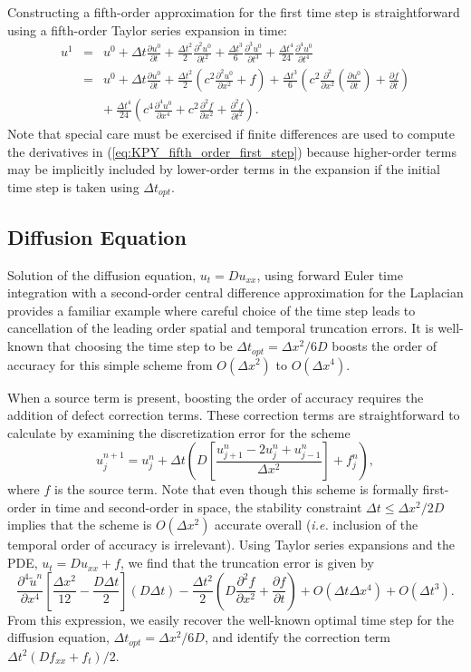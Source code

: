 \documentclass[fleqn,12pt,twoside]{article}
\newcommand{\beq}{\begin{equation}}
\newcommand{\eeq}{\end{equation}}
\newcommand{\bea}{\begin{eqnarray}}
\newcommand{\eea}{\end{eqnarray}}
\def\pt{\partial t}
\def\px{\partial x}
\def\tu{\tilde{u}}
\def\dt{\Delta t}
\def\dx{\Delta x}
\def\dto{\dt_{opt}}
\def\ie{\emph{i.e. }}
\begin{document}
Constructing a fifth-order approximation for the first time step is 
straightforward using a fifth-order Taylor series expansion in time:
\bea
  u^1 &=& u^0 + \dt \frac{\partial u^0}{\pt} 
              + \frac{\dt^2}{2} \frac{\partial^2 u^0}{\pt^2}
              + \frac{\dt^3}{6} \frac{\partial^3 u^0}{\pt^3} 
           + \frac{\dt^4}{24} \frac{\partial^4 u^0}{\pt^4}
  \nonumber \\
  &=& u^0 + \dt \frac{\partial u^0}{\pt} 
          + \frac{\dt^2}{2} \left(c^2 \frac{\partial^2 u^0}{\px^2} + f\right)
  + \frac{\dt^3}{6} \left(c^2 
    \frac{\partial^2}{\px^2} \left(\frac{\partial u^0}{\pt} \right) 
    + \frac{\partial f}{\pt}\right)
  \nonumber \\
  & & +\  \frac{\dt^4}{24} \left(c^4 \frac{\partial^4 u^0}{\px^4} 
  + c^2 \frac{\partial ^2 f}{\px^2} + \frac{\partial^2 f}{\pt^2} \right).
  \label{eq:KPY_fifth_order_first_step}
\eea
Note that special care must be exercised if finite differences are used to 
compute the derivatives in (\ref{eq:KPY_fifth_order_first_step}) because
higher-order terms may be implicitly included by lower-order terms in the 
expansion if the initial time step is taken using $\dto$.


\subsection{Diffusion Equation \label{sec:diffusion_eqn_1d}}
Solution of the diffusion equation, $u_t = D u_{xx}$, using forward Euler 
time integration with a second-order central difference approximation for 
the Laplacian provides a familiar example where careful choice of the time 
step leads to cancellation of the leading order spatial and temporal 
truncation errors.  It is well-known that choosing the time step to be 
$\dto = \dx^2/6D$ boosts the order of accuracy for this simple scheme 
from $O(\dx^2)$ to $O(\dx^4)$.

When a source term is present, boosting the order of accuracy requires
the addition of defect correction terms.  These correction terms are 
straightforward to calculate by examining the discretization error for the
scheme
\beq
  u^{n+1}_j = u^{n}_j 
  + \dt 
    \left( D \left[\frac{u^{n}_{j+1} -2 u^{n}_j + u^{n}_{j-1}}{\dx^2}\right] 
         + f^n_j \right),
  \label{eq:diffusion_eqn_1d_FD_scheme}
\eeq
where $f$ is the source term.  Note that even though this scheme is formally 
first-order in time and second-order in space, the stability constraint 
$\dt \le \dx^2/2D$ implies that the scheme is $O(\dx^2)$ accurate 
overall (\ie inclusion of the temporal order of accuracy is irrelevant).
Using Taylor series expansions and the PDE, $u_t = D u_{xx} + f$,
we find that the truncation error is given by
\beq
  \frac{\partial^4 \tu^n}{\px^4} 
    \left[ \frac{\dx^2}{12} - \frac{D \dt}{2} \right] (D \dt)
    - \frac{\dt^2}{2} \left( D \frac{\partial^2 f}{\px^2} 
                           + \frac{\partial f}{\pt} \right)
      + O(\dt \dx^4) + O(\dt^3).
  \label{eq:diffusion_eqn_1d_trunc_err}
\eeq
From this expression, we easily recover the well-known optimal time step for
the diffusion equation, $\dto = \dx^2/6D$, and identify the correction term 
$\dt^2 \left( D f_{xx} + f_t \right)  /2$.
\end{document}
